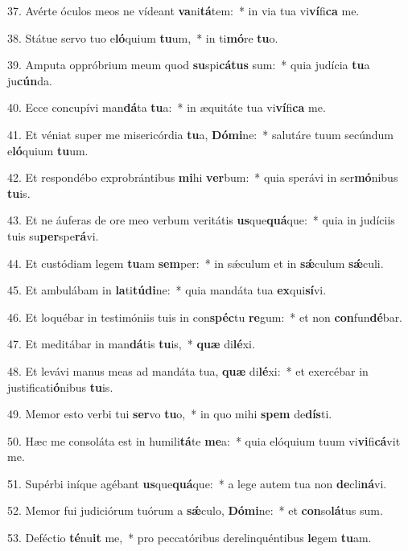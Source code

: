 37. Avérte óculos meos ne vídeant \textbf{va}ni\textbf{tá}tem:~*  in via tua vi\textbf{ví}fi\textbf{ca} me.\

38. Státue servo tuo e\textbf{ló}quium \textbf{tu}um,~*  in ti\textbf{mó}re \textbf{tu}o.\

39. Amputa oppróbrium meum quod \textbf{su}spi\textbf{cá}\textbf{tus} sum:~*  quia judícia \textbf{tu}a ju\textbf{cún}da.\

40. Ecce concupívi man\textbf{dá}ta \textbf{tu}a:~*  in æquitáte tua vi\textbf{ví}fi\textbf{ca} me.\

41. Et véniat super me misericórdia \textbf{tu}a, \textbf{Dó}\textbf{mi}ne:~*  salutáre tuum secúndum e\textbf{ló}quium \textbf{tu}um.\

42. Et respondébo exprobrántibus \textbf{mi}hi \textbf{ver}bum:~*  quia sperávi in ser\textbf{mó}nibus \textbf{tu}is.\

43. Et ne áuferas de ore meo verbum veritátis \textbf{us}que\textbf{quá}que:~*  quia in judíciis tuis su\textbf{per}spe\textbf{rá}vi.\

44. Et custódiam legem \textbf{tu}am \textbf{sem}per:~*  in sǽculum et in \textbf{sǽ}culum \textbf{sǽ}culi.\

45. Et ambulábam in \textbf{la}ti\textbf{tú}\textbf{di}ne:~*  quia mandáta tua \textbf{ex}qui\textbf{sí}vi.\

46. Et loquébar in testimóniis tuis in con\textbf{spéc}tu \textbf{re}gum:~*  et non \textbf{con}fun\textbf{dé}bar.\

47. Et meditábar in man\textbf{dá}tis \textbf{tu}is,~*  \textbf{quæ} di\textbf{lé}xi.\

48. Et levávi manus meas ad mandáta tua, \textbf{quæ} di\textbf{lé}xi:~*  et exercébar in justificati\textbf{ó}nibus \textbf{tu}is.\

49. Memor esto verbi tui \textbf{ser}vo \textbf{tu}o,~*  in quo mihi \textbf{spem} de\textbf{dís}ti.\

50. Hæc me consoláta est in humili\textbf{tá}te \textbf{me}a:~*  quia elóquium tuum vi\textbf{vi}fi\textbf{cá}vit me.\

51. Supérbi iníque agébant \textbf{us}que\textbf{quá}que:~*  a lege autem tua non \textbf{de}cli\textbf{ná}vi.\

52. Memor fui judiciórum tuórum a \textbf{sǽ}culo, \textbf{Dó}\textbf{mi}ne:~*  et \textbf{con}so\textbf{lá}tus sum.\

53. Deféctio \textbf{té}nu\textbf{it} me,~*  pro peccatóribus derelinquéntibus \textbf{le}gem \textbf{tu}am.\

